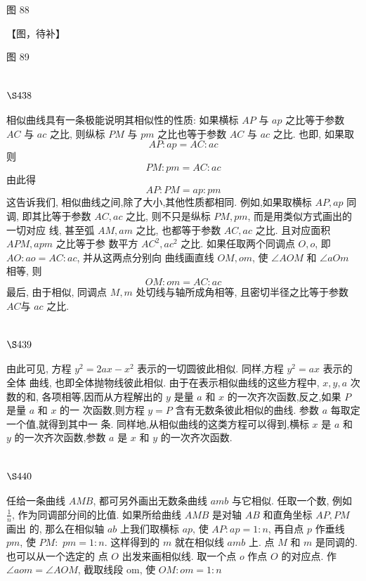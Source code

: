 图 88


【图，待补】

图 89

\section{$\S 438$}

相似曲线具有一条极能说明其相似性的性质: 如果横标 $A P$ 与 $a p$ 之比等于参数 $A C$ 与 $a c$ 之比, 则纵标 $P M$ 与 $p m$ 之比也等于参数 $A C$ 与 $a c$ 之比. 也即, 如果取
\[
A P: a p=A C: a c
\]
则
\[
P M: p m=A C: a c
\]
由此得
\[
A P: P M=a p: p m
\]
这告诉我们, 相似曲线之间,除了大小,其他性质都相同. 例如,如果取横标 $A P, a p$ 同调, 即其比等于参数 $A C, a c$ 之比, 则不只是纵标 $P M, p m$, 而是用类似方式画出的一切对应 线, 甚至弧 $A M, a m$ 之比, 也都等于参数 $A C, a c$ 之比. 且对应面积 $A P M, a p m$ 之比等于参 数平方 $A C^{2}, a c^{2}$ 之比. 如果任取两个同调点 $O, o$, 即 $A O: a o=A C: a c$, 并从这两点分别向 曲线画直线 $O M, o m$, 使 $\angle A O M$ 和 $\angle a O m$ 相等, 则
\[
O M: o m=A C: a c
\]
最后, 由于相似, 同调点 $M, m$ 处切线与轴所成角相等, 且密切半径之比等于参数 $A C 与$ $a c$ 之比.

\section{$\S 439$}

由此可见, 方程 $y^{2}=2 a x-x^{2}$ 表示的一切圆彼此相似. 同样,方程 $y^{2}=a x$ 表示的全体 曲线, 也即全体抛物线彼此相似. 由于在表示相似曲线的这些方程中, $x, y, a$ 次数的和, 各项相等,因而从方程解出的 $y$ 是量 $a$ 和 $x$ 的一次齐次函数,反之,如果 $P$ 是量 $a$ 和 $x$ 的一 次函数,则方程 $y=P$ 含有无数条彼此相似的曲线. 参数 $a$ 每取定一个值,就得到其中一 条. 同样地,从相似曲线的这类方程可以得到,横标 $x$ 是 $a$ 和 $y$ 的一次齐次函数,参数 $a$ 是 $x$ 和 $y$ 的一次齐次函数. 

\section{$\S 440$}

任给一条曲线 $A M B$, 都可另外画出无数条曲线 $a m b$ 与它相似. 任取一个数, 例如 $\frac{1}{n}$, 作为同调部分间的比值. 如果所给曲线 $A M B$ 是对轴 $A B$ 和直角坐标 $A P, P M$ 画出 的, 那么在相似轴 $a b$ 上我们取横标 $a p$, 使 $A P: a p=1: n$, 再自点 $p$ 作垂线 $p m$, 使 $P M:$ $p m=1: n$. 这样得到的 $m$ 就在相似线 $a m b$ 上. 点 $M$ 和 $m$ 是同调的. 也可以从一个选定的 点 $O$ 出发来画相似线. 取一个点 $o$ 作点 $O$ 的对应点. 作 $\angle a o m=\angle A O M$, 截取线段 om, 使 $O M: o m=1: n$

